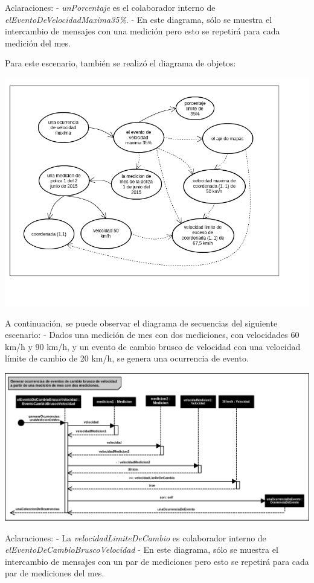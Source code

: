 Aclaraciones:
\newline
- \textit{unPorcentaje} es el colaborador interno de \textit{elEventoDeVelocidadMaxima35\%}.
\newline
- En este diagrama, sólo se muestra el intercambio de mensajes con una medición pero esto se 
repetirá para cada medición del mes.



Para este escenario, también se realizó el diagrama de objetos:
\newline

\centerline{\includegraphics[width=1\textwidth]{./imagenes/objetos_velmax.png}}


\newpage
A continuación, se puede observar el diagrama de secuencias del siguiente escenario:\newline
- Dados una medición de mes con dos mediciones, con velocidades 60 km/h y 90 km/h, 
y un evento de cambio brusco de velocidad con una velocidad límite de cambio de 20 km/h, 
se genera una ocurrencia de evento.
\newline


\centerline{\includegraphics[width=1\textwidth]{./imagenes/secuencias_brusco.png}}


Aclaraciones:\newline
- La \textit{velocidadLimiteDeCambio} es colaborador interno de \textit{elEventoDeCambioBruscoVelocidad}\newline
- En este diagrama, sólo se muestra el intercambio de mensajes con un par de mediciones pero esto se 
repetirá para cada par de mediciones del mes.
